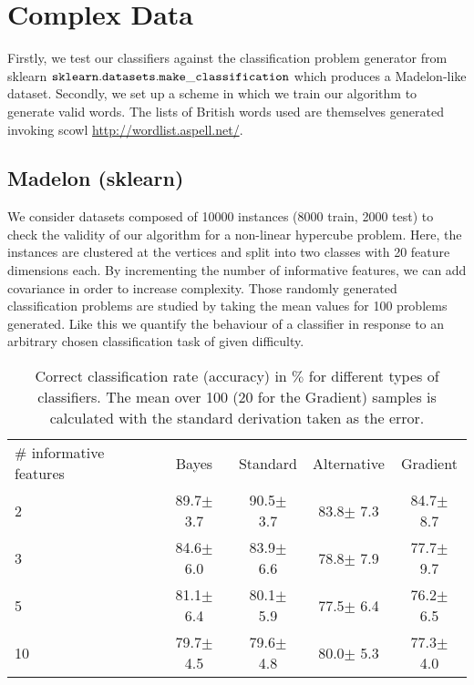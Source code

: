 \documentclass[draft]{article}
\begin{document}
\section{Complex Data}
Firstly, we test our classifiers against the classification problem generator from sklearn
\newline
${\tt sklearn.datasets.make\_classification}$ which produces a Madelon-like dataset.
Secondly, we set up a scheme in which we train our algorithm to generate valid words.
The lists of British words used are themselves generated invoking scowl
\url{http://wordlist.aspell.net/}.

\subsection{Madelon (sklearn)}
We consider datasets composed of 10000 instances (8000 train, 2000 test) to check the validity
of our algorithm for a non-linear hypercube problem. Here, the instances are clustered
at the vertices and split into two classes with 20 feature dimensions each.
By incrementing the number of informative features, we can add covariance in order to
increase complexity.
Those randomly generated classification problems are studied by taking the
mean values for 100 problems generated. Like this we quantify the behaviour of
a classifier in response to an arbitrary chosen classification task of given difficulty.

\begin{table}[h]
	\centering
	\begin{tabular}{l c c c c  }
		\# informative features	& Bayes 	& Standard	& Alternative & Gradient	\\
		2			& 89.7$\pm$ 3.7   &	90.5$\pm$ 3.7	  & 83.8$\pm$ 7.3		& 84.7$\pm$ 8.7 \\
	 	3			& 84.6$\pm$ 6.0	  &	83.9$\pm$ 6.6	  & 78.8$\pm$ 7.9		& 77.7$\pm$ 9.7 \\
		5			& 81.1$\pm$ 6.4   &	80.1$\pm$ 5.9	  & 77.5$\pm$ 6.4		& 76.2$\pm$ 6.5  \\
		10		& 79.7$\pm$ 4.5	  &	79.6$\pm$	4.8   & 80.0$\pm$ 5.3		& 77.3$\pm$ 4.0  \\
	\end{tabular}
	\caption{Correct classification rate (accuracy) in $\%$ for different types
	of classifiers. The mean over 100 (20 for the Gradient) samples
	is calculated with the standard derivation taken as the error.}
	\label{tab6}
\end{table}
\end{document}
